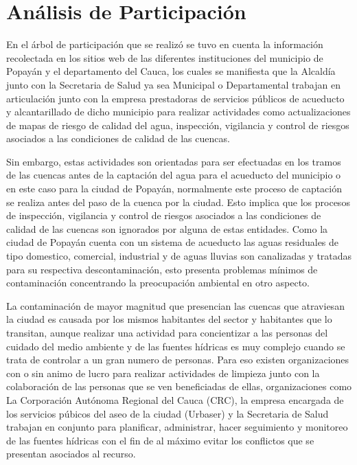 \section{Análisis de Participación}

En el árbol de participación que se realizó se tuvo en cuenta la información recolectada en los sitios web de las diferentes instituciones del municipio de Popayán y el departamento del Cauca, los cuales se manifiesta que la Alcaldía junto con la Secretaria de Salud ya sea Municipal o Departamental trabajan en articulación junto con la empresa prestadoras de servicios públicos de acueducto y alcantarillado de dicho municipio para realizar actividades como actualizaciones de mapas de riesgo de calidad del agua, inspección, vigilancia y control de riesgos asociados a las condiciones de calidad de las cuencas.

Sin embargo, estas actividades son orientadas para ser efectuadas en los tramos de las cuencas antes de la captación del agua para el acueducto del municipio o en este caso para la ciudad de Popayán, normalmente este proceso de captación se realiza antes del paso de la cuenca por la ciudad. Esto implica que los procesos de inspección, vigilancia y control de riesgos asociados a las condiciones de calidad de las cuencas son ignorados por alguna de estas entidades. Como la ciudad de Popayán cuenta con un sistema de acueducto las aguas residuales de tipo domestico, comercial, industrial y de aguas lluvias son canalizadas y tratadas para su respectiva descontaminación, esto presenta problemas mínimos de contaminación concentrando la preocupación ambiental en otro aspecto.

La contaminación de mayor magnitud que presencian las cuencas que atraviesan la ciudad es causada por los mismos habitantes del sector y habitantes que lo transitan, aunque realizar una actividad para concientizar a las personas del cuidado del medio ambiente y de las fuentes hídricas es muy complejo cuando se trata de controlar a un gran numero de personas. Para eso existen organizaciones con o sin animo de lucro para realizar actividades de limpieza junto con la colaboración de las personas que se ven beneficiadas de ellas, organizaciones como La Corporación Autónoma Regional del Cauca (CRC), la empresa encargada de los servicios púbicos del aseo de la ciudad (Urbaser) y la Secretaria de Salud trabajan en conjunto para planificar, administrar, hacer seguimiento y monitoreo de las fuentes hídricas con el fin de al máximo evitar los conflictos que se presentan asociados al recurso.


